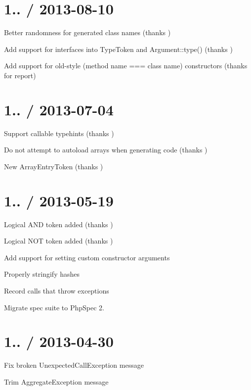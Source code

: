 \section*{1.. / 2013-\/08-\/10 }


\begin{DoxyItemize}
\item Better randomness for generated class names (thanks )
\item Add support for interfaces into Type\+Token and Argument\+::type() (thanks )
\item Add support for old-\/style (method name === class name) constructors (thanks  for report)
\end{DoxyItemize}

\section*{1.. / 2013-\/07-\/04 }


\begin{DoxyItemize}
\item Support callable typehints (thanks )
\item Do not attempt to autoload arrays when generating code (thanks )
\item New Array\+Entry\+Token (thanks )
\end{DoxyItemize}

\section*{1.. / 2013-\/05-\/19 }


\begin{DoxyItemize}
\item Logical {\ttfamily A\+ND} token added (thanks )
\item Logical {\ttfamily N\+OT} token added (thanks )
\item Add support for setting custom constructor arguments
\item Properly stringify hashes
\item Record calls that throw exceptions
\item Migrate spec suite to Php\+Spec 2.
\end{DoxyItemize}

\section*{1.. / 2013-\/04-\/30 }


\begin{DoxyItemize}
\item Fix broken Unexpected\+Call\+Exception message
\item Trim Aggregate\+Exception message
\end{DoxyItemize}

